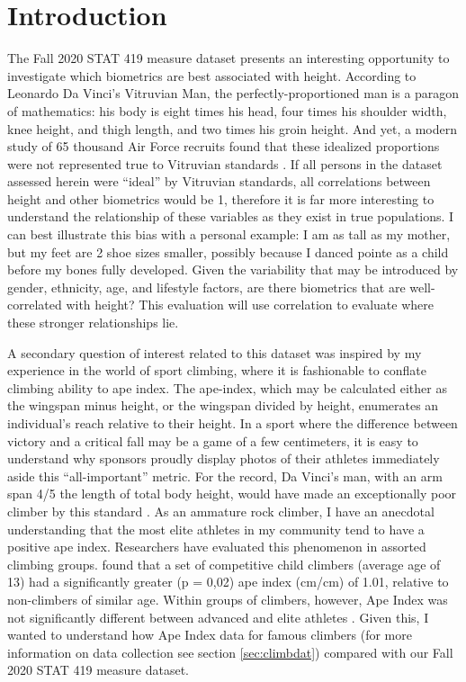 \documentclass[]{article}
\begin{document}
\vskip -8.5pt




\noindent  

\section{Introduction}
\label{sec:intro}

\indent The Fall 2020 STAT 419 measure dataset presents an interesting
opportunity to investigate which biometrics are best associated with
height. According to Leonardo Da Vinci's Vitruvian Man, the
perfectly-proportioned man is a paragon of mathematics: his body is
eight times his head, four times his shoulder width, knee height, and
thigh length, and two times his groin height. And yet, a modern study of
65 thousand Air Force recruits found that these idealized proportions
were not represented true to Vitruvian standards \citep{Thomas:2020}. If
all persons in the dataset assessed herein were ``ideal'' by Vitruvian
standards, all correlations between height and other biometrics would be
1, therefore it is far more interesting to understand the relationship
of these variables as they exist in true populations. I can best
illustrate this bias with a personal example: I am as tall as my mother,
but my feet are 2 shoe sizes smaller, possibly because I danced pointe
as a child before my bones fully developed. Given the variability that
may be introduced by gender, ethnicity, age, and lifestyle factors, are
there biometrics that are well-correlated with height? This evaluation
will use correlation to evaluate where these stronger relationships lie.

\indent A secondary question of interest related to this dataset was
inspired by my experience in the world of sport climbing, where it is
fashionable to conflate climbing ability to ape index. The ape-index,
which may be calculated either as the wingspan minus height, or the
wingspan divided by height, enumerates an individual's reach relative to
their height. In a sport where the difference between victory and a
critical fall may be a game of a few centimeters, it is easy to
understand why sponsors proudly display photos of their athletes
immediately aside this ``all-important'' metric. For the record, Da
Vinci's man, with an arm span 4/5 the length of total body height, would
have made an exceptionally poor climber by this standard
\citep{Thomas:2020}. As an ammature rock climber, I have an anecdotal
understanding that the most elite athletes in my community tend to have
a positive ape index. Researchers have evaluated this phenomenon in
assorted climbing groups. \citet{Watts:2003} found that a set of
competitive child climbers (average age of 13) had a significantly
greater (p = 0,02) ape index (cm/cm) of 1.01, relative to non-climbers
of similar age. Within groups of climbers, however, Ape Index was not
significantly different between advanced and elite athletes
\citep{Ozimek:2017}. Given this, I wanted to understand how Ape Index
data for famous climbers (for more information on data collection see
section \ref{sec:climbdat}) compared with our Fall 2020 STAT 419 measure
dataset.
\end{document}
